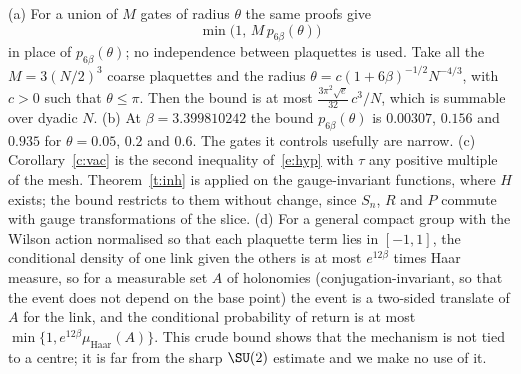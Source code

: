 \begin{remark}\label{r:ret}
(a) For a union of $M$ gates of radius $\theta$ the same proofs give
\[\min\big(1,\,M\,p_{6\beta}(\theta)\big)\]
in place of $p_{6\beta}(\theta)$; no independence between plaquettes is used. Take all the
$M=3(N/2)^3$ coarse plaquettes and the radius $\theta=c(1+6\beta)^{-1/2}N^{-4/3}$, with $c>0$ such that
$\theta\le\pi$. Then the bound is at most $\tfrac{3\pi^2\sqrt e}{32}\,c^3/N$, which is summable over dyadic $N$.
(b) At $\beta=3.399810242$ the bound $p_{6\beta}(\theta)$ is $0.00307$, $0.156$ and $0.935$ for
$\theta=0.05$, $0.2$ and $0.6$. The gates it controls usefully are narrow. (c) Corollary~\ref{c:vac} is the
second inequality of~\eqref{e:hyp} with $\tau$ any positive multiple of the mesh. Theorem~\ref{t:inh} is applied on the gauge-invariant functions, where $H$ exists; the bound restricts to
them without change, since $S_n$, $R$ and $P$ commute with gauge transformations of the slice. (d) For a general compact group with the Wilson action normalised so that each plaquette term lies in
$[-1,1]$, the conditional density of one link given the others is at most $e^{12\beta}$ times Haar measure,
so for a measurable set $A$ of holonomies (conjugation-invariant, so that the event does not depend on the
base point) the event is a two-sided translate of $A$ for the link, and the conditional probability of return
is at most $\min\{1,e^{12\beta}\mu_{\mathrm{Haar}}(A)\}$. This crude bound shows that the mechanism is not tied to a
centre; it is far from the sharp $\SU(2)$ estimate and we make no use of it.
\end{remark}

